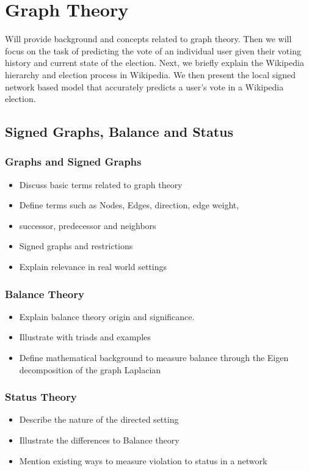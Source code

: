 \chapter{Graph Theory}
\label{chp:graph-theory} 
Will provide background and concepts related to graph theory. Then we will focus on the task of predicting the vote of an individual user given their voting history and current state of the election. Next, we briefly explain the Wikipedia hierarchy and election process in Wikipedia. We then present the local signed network based model that accurately predicts a user's vote in a Wikipedia election. 

\section{Signed Graphs, Balance and Status}
\subsection{Graphs and Signed Graphs }
\begin{itemize}
    \item Discuss basic terms related to graph theory 
    \item Define terms such as Nodes, Edges, direction, edge weight,
    \item successor, predecessor and neighbors
    \item Signed graphs and restrictions 
    \item Explain relevance in real world settings
\end{itemize}

\subsection{Balance Theory}
\begin{itemize}
    \item Explain balance theory origin and significance.
    \item Illustrate with triads and examples
    \item Define mathematical background to measure balance through the Eigen decomposition of the graph Laplacian  
\end{itemize}

\subsection{Status Theory}
\begin{itemize}
    \item Describe the nature of the directed setting
    \item Illustrate the differences to Balance theory
    \item Mention existing ways to measure violation to status in a network
\end{itemize}


